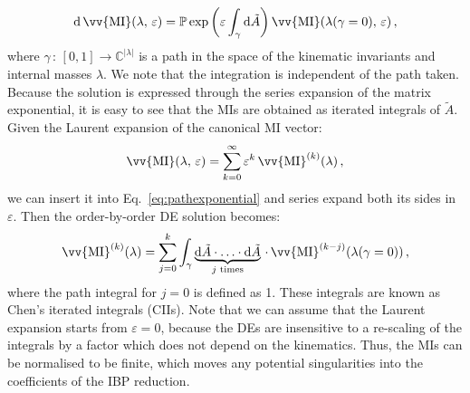 \documentclass[main.tex]{subfiles}
\begin{document}
\begin{equation} \label{eq:pathexponential}
    \dd \,\vv{\text{MI}}(\lambda,\, \varepsilon) = \mathbb{P} \exp \left(\varepsilon\int_\gamma \dd \tilde{A} \right) \vv{\text{MI}}(\lambda(\gamma=0),\,\varepsilon )\,,
\end{equation}
where $\gamma\,:\,[0, 1] \rightarrow \mathbb{C}^{|\lambda|}$ is a path in the space of the kinematic invariants and internal masses $\lambda$. We note that the integration is independent of the path taken. Because the solution is expressed through the series expansion of the matrix exponential, it is easy to see that the MIs are obtained as iterated integrals of $\tilde{A}$. Given the Laurent expansion of the canonical MI vector:
\begin{equation} \label{eq:MIlaurentexp}
    \vv{\text{MI}}(\lambda, \, \varepsilon) = \sum_{k=0}^\infty \varepsilon^k\,\vv{\text{MI}}^{(k)}(\lambda) \,,
\end{equation}
we can insert it into Eq.~\ref{eq:pathexponential} and series expand both its sides in $\varepsilon$. Then the order-by-order DE solution becomes:
\begin{equation} \label{eq:DEssolution}
    \vv{\text{MI}}^{(k)}(\lambda) = \sum_{j=0}^k \int_\gamma \underbrace{\dd \tilde{A} \cdot \ldots \cdot \dd \tilde{A}}_{j\text{ times}} \, \cdot \, \vv{\text{MI}}^{(k-j)}(\lambda(\gamma=0))\,,
\end{equation}
where the path integral for $j=0$ is defined as 1\cite{Chen:1977oja}. These integrals are known as Chen's iterated integrals (CIIs). Note that we can assume that the Laurent expansion starts from $\varepsilon=0$, because the DEs are insensitive to a re-scaling of the integrals by a factor which does not depend on the kinematics. Thus, the MIs can be normalised to be finite, which moves any potential singularities into the coefficients of the IBP reduction. 
\end{document}
